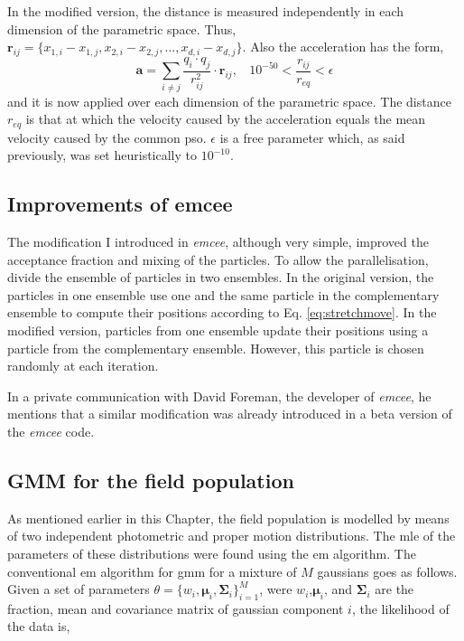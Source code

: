 In the modified version, the distance is measured independently in each dimension of the parametric space. Thus, $\mathbf{r}_{ij}= \{x_{1,i} -x_{1,j},x_{2,i} -x_{2,j},...,x_{d,i} -x_{d,j}\}$. Also the acceleration has the form,
\begin{equation}
\label{eq:PSOacc}
\mathbf{a}=\sum_{i\neq j} \frac{q_i \cdot q_j }{r_{ij}^2} \cdot \mathbf{r}_{ij}, \ \ \ \  10^{-50} < \frac{r_{ij}}{r_{eq}} < \epsilon
\end{equation}
and it is now applied over each dimension of the parametric space. The distance $r_{eq}$ is that at which the velocity caused by the acceleration equals the mean velocity caused by the common \gls{pso}. $\epsilon$ is a free parameter which, as said previously, was set heuristically to $10^{-10}$.

\subsection{Improvements of emcee}
The modification I introduced in \emph{emcee}, although very simple, improved the acceptance fraction and mixing of the particles.
To allow the parallelisation, \citet{Foreman2013} divide the ensemble of particles in two ensembles. In the original version, the particles in one ensemble use one and the same particle in the complementary ensemble to compute their positions according to Eq. \ref{eq:stretchmove}. In the modified version, particles from one ensemble update their positions using a particle from the complementary ensemble. However, this particle is chosen randomly at each iteration. 

In a private communication with David Foreman, the developer of \emph{emcee}, he mentions that a similar modification was already introduced in a beta version of the \emph{emcee} code.

\subsection{GMM for the field population}
As mentioned earlier in this Chapter, the field population is modelled by means of two independent photometric and proper motion distributions. The \gls{mle} of the parameters of these distributions were found using the \gls{em} algorithm.  The conventional \gls{em} algorithm for \gls{gmm} \citep{Dempster1977} for a mixture of $M$ gaussians goes as follows. Given a set of parameters $\theta=\{w_i,\boldsymbol{\mu}_i,\boldsymbol{\Sigma}_i\}_{i=1}^M$, were $w_i$,$\boldsymbol{\mu}_i$, and $\boldsymbol{\Sigma}_i$ are the fraction, mean and covariance matrix of gaussian component $i$, the likelihood of the data is,

